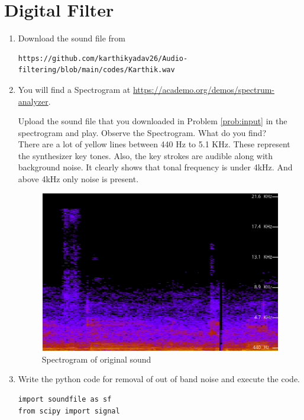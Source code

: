 \documentclass[journal,12pt,twocolumn]{IEEEtran}
\theoremstyle{remark}
\renewcommand\thesection{\arabic{section}}
\begin{document}
\section{Digital Filter}
\begin{enumerate}[label=\thesection.\arabic*
,ref=\thesection.\theenumi]
\item
\label{prob:input}
Download the sound file from  
\begin{lstlisting}
https://github.com/karthikyadav26/Audio-filtering/blob/main/codes/Karthik.wav
\end{lstlisting}

\item
\label{prob:spectrogram}
You will find a Spectrogram at \href{https://academo.org/demos/spectrum-analyzer}{\url{https://academo.org/demos/spectrum-analyzer}}. 

Upload the sound file that you downloaded in Problem \ref{prob:input} in the spectrogram  and play.  Observe the Spectrogram. What do you find?\bigskip
\\
\solution There are a lot of yellow lines between 440 Hz to 5.1 KHz.  These represent the synthesizer key tones. Also, the key strokes are audible along with background noise. It clearly shows that tonal frequency is under 4kHz. And above 4kHz only noise is present.\\
\newpage
\begin{figure}[htbp]
    \centering
    \includegraphics[width=0.85\columnwidth]{figs/spectrogram.png}
    \caption{Spectrogram of original sound}
    \label{fig:spectrogram_with_noise}
\end{figure}
\item
\label{prob:output}

Write the python code for removal of out of band noise and execute the code.
\\
\solution
\begin{lstlisting}
import soundfile as sf
from scipy import signal
 

\end{lstlisting}
\end{enumerate}
\end{document}
